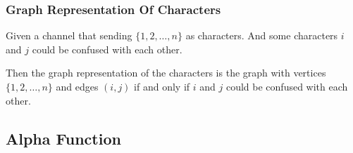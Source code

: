 \documentclass{beamer}
\begin{document}
                  \begin{frame}
                        \frametitle{Graph Representation Of Characters}
                        \begin{definition}\label{def:graphRepresetationOfChannel}
                              Given a channel that sending $\{1,2,\dots,n\}$ as characters. And some characters $i$ and $j$ could be confused with each other.

                              \pause

                              Then the graph representation of the characters is the graph with vertices $\{1,2,\dots,n\}$ and edges $(i,j)$ if and only if $i$ and $j$ could be confused with each other.
                        \end{definition}
                  \end{frame}

            \subsection{Alpha Function}
\end{document}
